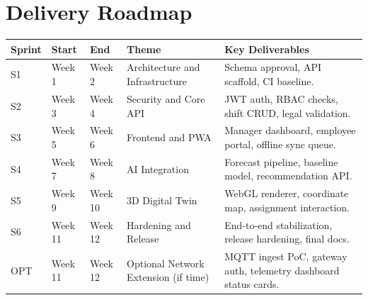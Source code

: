 \documentclass[11pt,a4paper]{article}
\newcommand{\thead}[1]{\textcolor{HeaderText}{\textbf{#1}}}
\begin{document}
\section{Delivery Roadmap}
\begin{tabularx}{\textwidth}{P{0.08\textwidth}P{0.13\textwidth}P{0.13\textwidth}P{0.23\textwidth}Y}
\toprule
{}
\thead{Sprint} & \thead{Start} & \thead{End} & \thead{Theme} & \thead{Key Deliverables} \\
\midrule
S1 & Week 1 & Week 2 & Architecture and Infrastructure & Schema approval, API scaffold, CI baseline. \\
S2 & Week 3 & Week 4 & Security and Core API & JWT auth, RBAC checks, shift CRUD, legal validation. \\
S3 & Week 5 & Week 6 & Frontend and PWA & Manager dashboard, employee portal, offline sync queue. \\
S4 & Week 7 & Week 8 & AI Integration & Forecast pipeline, baseline model, recommendation API. \\
S5 & Week 9 & Week 10 & 3D Digital Twin & WebGL renderer, coordinate map, assignment interaction. \\
S6 & Week 11 & Week 12 & Hardening and Release & End-to-end stabilization, release hardening, final docs. \\
OPT & Week 11 & Week 12 & Optional Network Extension (if time) & MQTT ingest PoC, gateway auth, telemetry dashboard status cards. \\
\bottomrule
\end{tabularx}
\end{document}
